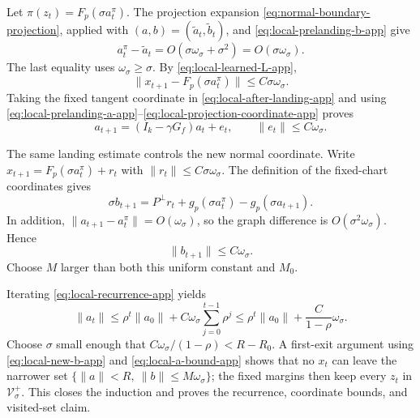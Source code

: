 Let $\pi(z_t)=F_p(\sigma a_t^\pi)$.  The projection expansion
\eqref{eq:normal-boundary-projection}, applied with
$(a,b)=(\widetilde a_t,\widetilde b_t)$, and
\eqref{eq:local-prelanding-b-app} give
\begin{equation}
  a_t^\pi-\widetilde a_t
  =O(\sigma\omega_\sigma+\sigma^2)
  =O(\sigma\omega_\sigma).
  \label{eq:local-projection-coordinate-app}
\end{equation}
The last equality uses $\omega_\sigma\ge\sigma$.
By \eqref{eq:local-learned-L-app},
\begin{equation}
  \|x_{t+1}-F_p(\sigma a_t^\pi)\|
  \le C\sigma\omega_\sigma.
  \label{eq:local-after-landing-app}
\end{equation}
Taking the fixed tangent coordinate in
\eqref{eq:local-after-landing-app} and using
\eqref{eq:local-prelanding-a-app}--\eqref{eq:local-projection-coordinate-app}
proves
\begin{equation}
  a_{t+1}
  =(I_k-\gamma G_f)a_t+e_t,\qquad
  \|e_t\|\le C\omega_\sigma.
  \label{eq:local-recurrence-app}
\end{equation}

The same landing estimate controls the new normal coordinate.  Write
$x_{t+1}=F_p(\sigma a_t^\pi)+r_t$ with
$\|r_t\|\le C\sigma\omega_\sigma$.  The definition of the fixed-chart
coordinates gives
\begin{equation}
  \sigma b_{t+1}
  =
  P^\perp r_t
  +g_p(\sigma a_t^\pi)-g_p(\sigma a_{t+1}).
\end{equation}
In addition,
$\|a_{t+1}-a_t^\pi\|=O(\omega_\sigma)$, so the graph difference is
$O(\sigma^2\omega_\sigma)$.  Hence
\begin{equation}
  \|b_{t+1}\|\le C\omega_\sigma.
  \label{eq:local-new-b-app}
\end{equation}
Choose $M$ larger than both this uniform constant and $M_0$.

Iterating \eqref{eq:local-recurrence-app} yields
\begin{equation}
  \|a_t\|
  \le
  \rho^t\|a_0\|
  +C\omega_\sigma\sum_{j=0}^{t-1}\rho^j
  \le
  \rho^t\|a_0\|
  +\frac{C}{1-\rho}\omega_\sigma.
  \label{eq:local-a-bound-app}
\end{equation}
Choose $\sigma$ small enough that
$C\omega_\sigma/(1-\rho)<R-R_0$.  A first-exit argument using
\eqref{eq:local-new-b-app} and \eqref{eq:local-a-bound-app} shows that
no $x_t$ can leave the narrower set
$\{\|a\|<R,\ \|b\|\le M\omega_\sigma\}$; the fixed margins then keep
every $z_t$ in $\mathcal V_\sigma^+$.  This closes the induction and proves
the recurrence, coordinate bounds, and visited-set claim.

